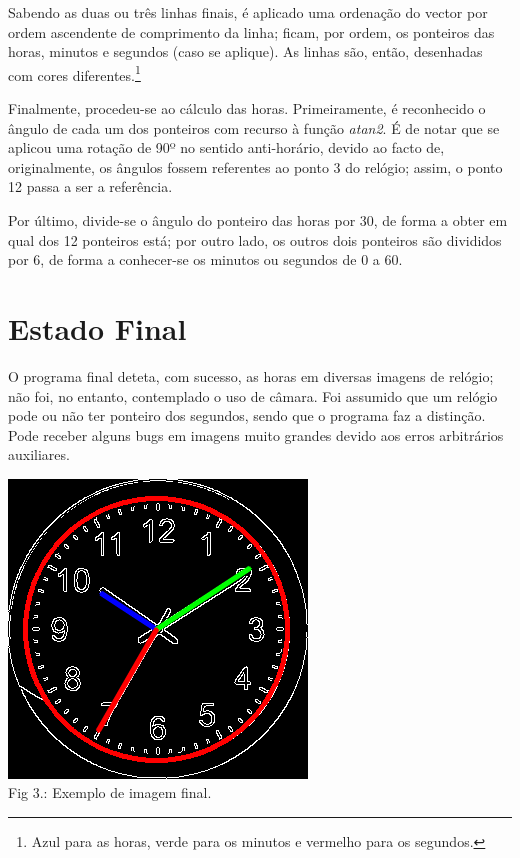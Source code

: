 \documentclass[a4paper]{article}
\begin{document}
Sabendo as duas ou três linhas finais, é aplicado uma ordenação do vector por ordem ascendente de comprimento da linha; ficam, por ordem, os ponteiros das horas, minutos e segundos (caso se aplique). As linhas são, então, desenhadas com cores diferentes.\footnote{Azul para as horas, verde para os minutos e vermelho para os segundos.}

Finalmente, procedeu-se ao cálculo das horas. Primeiramente, é reconhecido o ângulo de cada um dos ponteiros com recurso à função \textit{atan2}. É de notar que se aplicou uma rotação de 90º no sentido anti-horário, devido ao facto de, originalmente, os ângulos fossem referentes ao ponto 3 do relógio; assim, o ponto 12 passa a ser a referência. 

Por último, divide-se o ângulo do ponteiro das horas por 30, de forma a obter em qual dos 12 ponteiros está; por outro lado, os outros dois ponteiros são divididos por 6, de forma a conhecer-se os minutos ou segundos de 0 a 60.

\pagebreak
\section{Estado Final}

O programa final deteta, com sucesso, as horas em diversas imagens de relógio; não foi, no entanto, contemplado o uso de câmara. Foi assumido que um relógio pode ou não ter ponteiro dos segundos, sendo que o programa faz a distinção. Pode receber alguns bugs em imagens muito grandes devido aos erros arbitrários auxiliares.

\begin{center}
    \includegraphics[scale=0.5]{final_image.png}
    \\ Fig 3.: Exemplo de imagem final.
\end{center}
\end{document}
